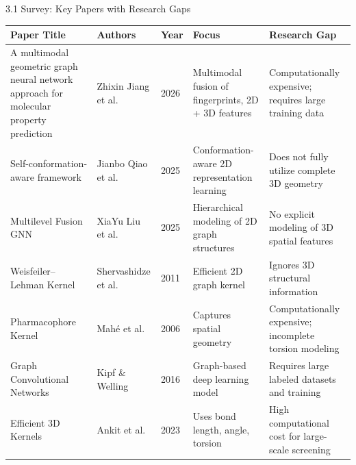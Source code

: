 \documentclass[aspectratio=169, 11pt]{beamer}
\begin{document}
\begin{frame}{3.1 Survey: Key Papers with Research Gaps}
\scriptsize
\setlength{\tabcolsep}{2pt}

\begin{tabular}{|p{2.8cm}|p{2.3cm}|p{0.9cm}|p{3.2cm}|p{3.8cm}|}
\hline
\textbf{Paper Title} & \textbf{Authors} & \textbf{Year} & \textbf{Focus} & \textbf{Research Gap} \\ \hline

A multimodal geometric graph neural network approach for molecular property prediction \cite{jiang2026qegnn}
& Zhixin Jiang et al. 
& 2026 
& Multimodal fusion of fingerprints, 2D + 3D features 
& Computationally expensive; requires large training data \\ \hline

Self-conformation-aware framework \cite{qiao2025self}
& Jianbo Qiao et al. 
& 2025 
& Conformation-aware 2D representation learning 
& Does not fully utilize complete 3D geometry \\ \hline

Multilevel Fusion GNN \cite{liu2025multilevel}
& XiaYu Liu et al. 
& 2025 
& Hierarchical modeling of 2D graph structures 
& No explicit modeling of 3D spatial features \\ \hline

Weisfeiler–Lehman Kernel \cite{shervashidze2011wl}
& Shervashidze et al. 
& 2011 
& Efficient 2D graph kernel 
& Ignores 3D structural information \\ \hline

Pharmacophore Kernel \cite{mahe2006pharmacophore}
& Mahé et al. 
& 2006 
& Captures spatial geometry 
& Computationally expensive; incomplete torsion modeling \\ \hline

Graph Convolutional Networks \cite{kipf2016gcn}
& Kipf \& Welling 
& 2016 
& Graph-based deep learning model 
& Requires large labeled datasets and training \\ \hline

Efficient 3D Kernels \cite{ankit2023efficient3d}
& Ankit et al. 
& 2023 
& Uses bond length, angle, torsion 
& High computational cost for large-scale screening \\ \hline


\end{tabular}
\end{frame}
\end{document}
